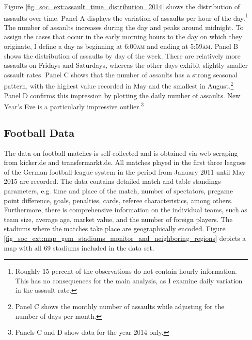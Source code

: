 Figure \ref{fig_soc_ext:assault_time_distribution_2014} shows the distribution of assaults over time. Panel A displays the variation of assaults per hour of the day.\footnote{Roughly 15 percent of the observations do not contain hourly information. This has no consequences for the main analysis, as I examine daily variation in the assault rate.} The number of assaults increases during the day and peaks around midnight. To assign the cases that occur in the early morning hours to the day on which they originate, I define a day as beginning at 6:00\textsc{am} and ending at 5:59\textsc{am}. Panel B shows the distribution of assaults by day of the week. There are relatively more assaults on Fridays and Saturdays, whereas the other days exhibit slightly smaller assault rates. Panel C shows that the number of assaults has a strong seasonal pattern, with the highest value recorded in May and the smallest in August.\footnote{Panel C shows the monthly number of assaults while adjusting for the number of days per month.} Panel D confirms this impression by plotting the daily number of assaults. New Year's Eve is a particularly impressive outlier.\footnote{Panels C and D show data for the year 2014 only.}






\subsection{Football Data}
The data on football matches is self-collected and is obtained via web scraping from kicker.de and transfermarkt.de. All matches played in the first three leagues of the German football league system in the period from January 2011 until May 2015 are recorded. The data contains detailed match and table standings parameters, e.g. time and place of the match, number of spectators, pregame point difference, goals, penalties, cards, referee characteristics, among others. Furthermore, there is comprehensive information on the individual teams, such as team size, average age, market value, and the number of foreign players. The stadiums where the matches take place are geographically encoded. Figure \ref{fig_soc_ext:map_gem_stadiums_monitor_and_neighboring_regions} depicts a map with all 69 stadiums included in the data set.






